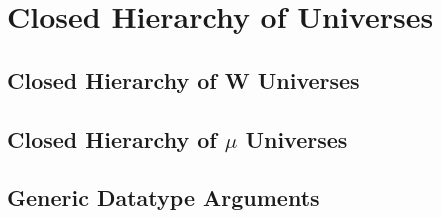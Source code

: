 \documentclass[12pt]{report}
\theoremstyle{definition}
\theoremstyle{remark}
\numberwithin{definition}{section}
\numberwithin{equation}{section}
\numberwithin{proposition}{section}
\numberwithin{conjecture}{section}
\numberwithin{theorem}{section}
\numberwithin{lemma}{section}
\numberwithin{corollary}{section}
\numberwithin{example}{section}
\numberwithin{remark}{section}
\begin{document}


\part{Closed Hierarchy of Universes}\label{part:hier}

\chapter{Closed Hierarchy of W Universes}\label{ch:hier}
\chapter{Closed Hierarchy of $\mu$ Universes}\label{ch:hier}
\chapter{Generic Datatype Arguments}\label{ch:gargs}





\end{document}
